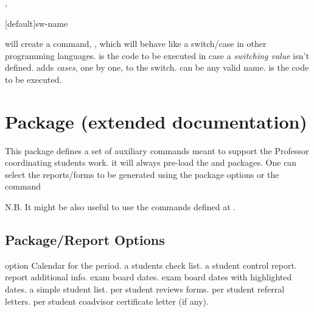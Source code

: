\documentclass[article,nogeometry,english,tocdepth=3,secdepth=3]{ufrgscca} %
\newif\iffulldoc
\begin{document}
\begin{codedescribe}{\mkswitch,\addcase}
	\begin{codesyntax}%
		\tsmacro{\mkswitch}[default]{sw-name}
	\end{codesyntax}
	 will create a command, , which will behave like a switch/case in other programming languages.  is the code to be executed in case a \emph{switching value} isn't defined.
	\tsmacro{\addcase}{} adds \emph{cases}, one by one, to the switch.  can be any \tsmacro{\csname}{} valid name.  is the code to be executed.

	\begin{codestore}[st=d.switch]
		\mkswitch[\gr@depcut]\gr@case@angle
		\addcase{}
		\addcase{}
	\end{codestore}
\end{codedescribe}
\fi

\iffulldoc
\section{ Package (extended documentation)}
This package defines a set of auxiliary commands meant to support the Professor coordinating students work.
it will always pre-load the  and  packages. One can select the reports/forms to be generated using the package options or the command 

N.B. It might be also useful to use the commands defined at .

\subsection{Package/Report Options}\label{ufrgscca-coord.options}
\begin{describelist}{option}
	 { Calendar for the period.}
	 { a students check list.}
	 { a student control report.}
	 { report additional info.}
	 { exam board dates.}
	 { exam board dates with highlighted dates.}
	 { a simple student list.}
	 { per student reviews forms.}
	 { per student referral letters.}
	 { per student coadvisor certificate letter (if any).}
\end{describelist}
\end{document}
